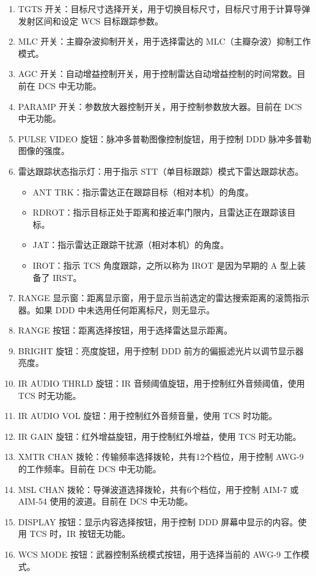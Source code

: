 \begin{enumerate}
	\item TGTS 开关：目标尺寸选择开关，用于切换目标尺寸，目标尺寸用于计算导弹发射区间和设定 WCS 目标跟踪参数。
	\item MLC 开关：主瓣杂波抑制开关，用于选择雷达的 MLC（主瓣杂波）抑制工作模式。
	\item AGC 开关：自动增益控制开关，用于控制雷达自动增益控制的时间常数。目前在 DCS 中无功能。
	\item PARAMP 开关：参数放大器控制开关，用于控制参数放大器。目前在 DCS 中无功能。
	\item PULSE VIDEO 旋钮：脉冲多普勒图像控制旋钮，用于控制 DDD 脉冲多普勒图像的强度。
	\item 雷达跟踪状态指示灯：用于指示 STT（单目标跟踪）模式下雷达跟踪状态。
	      \begin{itemize}
		      \item ANT TRK：指示雷达正在跟踪目标（相对本机）的角度。
		      \item RDROT：指示目标正处于距离和接近率门限内，且雷达正在跟踪该目标。
		      \item JAT：指示雷达正跟踪干扰源（相对本机）的角度。
		      \item IROT：指示 TCS 角度跟踪，之所以称为 IROT 是因为早期的 A 型上装备了 IRST。
	      \end{itemize}
	\item RANGE 显示窗：距离显示窗，用于显示当前选定的雷达搜索距离的滚筒指示器。如果 DDD 中未选用任何距离标尺，则无显示。
	\item RANGE 按钮：距离选择按钮，用于选择雷达显示距离。
	\item BRIGHT 旋钮：亮度旋钮，用于控制 DDD 前方的偏振滤光片以调节显示器亮度。
	\item IR AUDIO THRLD 旋钮：IR 音频阈值旋钮，用于控制红外音频阈值，使用 TCS 时无功能。
	\item IR AUDIO VOL 旋钮：用于控制红外音频音量，使用 TCS 时功能。
	\item IR GAIN 旋钮：红外增益旋钮，用于控制红外增益，使用 TCS 时无功能。
	\item XMTR CHAN 拨轮：传输频率选择拨轮，共有12个档位，用于控制 AWG-9 的工作频率。目前在 DCS 中无功能。
	\item MSL CHAN 拨轮：导弹波道选择拨轮，共有6个档位，用于控制 AIM-7 或 AIM-54 使用的波道。目前在 DCS 中无功能。
	\item DISPLAY 按钮：显示内容选择按钮，用于控制 DDD 屏幕中显示的内容。使用 TCS 时，IR 按钮无功能。
	\item WCS MODE 按钮：武器控制系统模式按钮，用于选择当前的 AWG-9 工作模式。

\end{enumerate}
